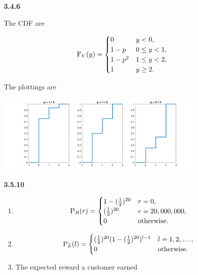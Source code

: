 \documentclass{article}
\begin{document}
\begin{enumerate}
\begin{enumerate}[label=(\alph*)]
    \end{enumerate}

    \item [\textbf{3.4.6}]

    The CDF are

    $$
    \text F_Y(y) =
    \begin{cases}
        0       & y < 0, \\
        1 - p   & 0 \le y < 1, \\
        1 - p^2 & 1 \le y < 2, \\
        1       & y \ge 2.
    \end{cases}
    $$

    The plottings are

    \includegraphics[width=0.8\textwidth]{img/3.4.6.png}

    \item [\textbf{3.5.10}]

    \begin{enumerate}[label=(\alph*)]
        \item

        $$
        \text P_R(r) =
        \begin{cases}
            1 - (\frac{1}{2})^{20} & r = 0, \\
            (\frac{1}{2})^{20}     & r = 20,000,000, \\
            0                      & \text{otherwise}.
        \end{cases}
        $$

        \item

        $$
        \text P_L(l) =
        \begin{cases}
            (\frac{1}{2})^{20}(1 - (\frac{1}{2})^{20})^{l - 1} & l = 1, 2, \ldots, \\
            0                & \text{otherwise}.
        \end{cases}
        $$

        \item The expected reward a customer earned


\end{enumerate}
\end{enumerate}
\end{document}
